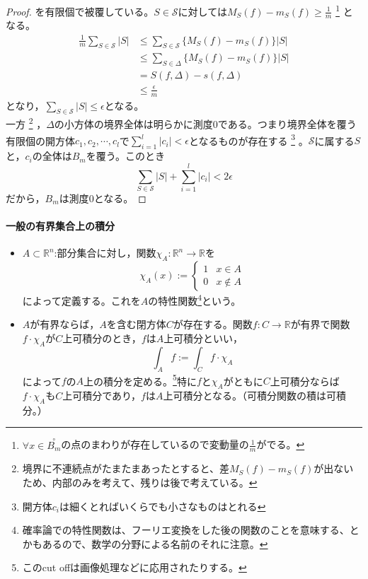 \begin{proof}
{    }
    を有限個で被覆している。$S\in\mathscr{S}$に対しては$\displaystyle M_S(f)-m_S(f)\geq\frac{1}{m}$
    \footnote{
    $\forall x\in\overset{\circ}{B_m}$の点のまわりが存在しているので変動量の$\frac{1}{m}$がでる。
    }
    となる。
	\[
	\begin{split}
		\frac{1}{m}\sum_{S\in\mathscr{S}}|S|
		&\leq\sum_{S\in\mathscr{S}}\{M_S(f)-m_S(f)\}|S| \\
		&\leq\sum_{S\in\Delta}\{M_S(f)-m_S(f)\}|S| \\
		&= S(f,\Delta)-s(f,\Delta) \\
		&\leq\frac{\epsilon}{m}
	\end{split}
	\]
	となり，$\displaystyle\sum_{S\in\mathscr{S}}|S|\leq\epsilon$となる。\\
	一方
    \footnote{
    境界に不連続点がたまたまあったとすると、差$M_S(f)-m_S(f)$が出ないため、内部のみを考えて、残りは後で考えている。
    }
    ，$\Delta$の小方体の境界全体は明らかに測度$0$である。つまり境界全体を覆う有限個の開方体$c_1,c_2,\cdots,c_l$で$\displaystyle \sum_{i=1}^l|c_i|<\epsilon$となるものが存在する
    \footnote{開方体$c_i$は細くとればいくらでも小さなものはとれる
    }
    。$\mathscr{S}$に属する$S$と，$c_i$の全体は$B_m$を覆う。このとき
	\[
	\sum_{S\in\mathscr{S}}|S|+\sum_{i=1}^l|c_i|<2\epsilon
	\]
	だから，$B_m$は測度$0$となる。
\end{proof}

\paragraph{一般の有界集合上の積分}
\begin{itemize}
	\item $A\subset\mathbb{R}^n$:部分集合に対し，関数$\chi_A:\mathbb{R}^n\to\mathbb{R}$を
	\[
		\chi_A(x):=
		\begin{cases}
			1 & x\in A\\
			0 & x\notin A
		\end{cases}
	\]
	によって定義する。これを$A$の特性関数\footnote{確率論での特性関数は、フーリエ変換をした後の関数のことを意味する、とかもあるので、数学の分野による名前のそれに注意。}という。
	\item $A$が有界ならば，$A$を含む閉方体$C$が存在する。関数$f:C\to\mathbb{R}$が有界で関数$f\cdot\chi_A$が$C$上可積分のとき，$f$は$A$上可積分といい，
	\[
		\int_A f := \int_C f\cdot\chi_A
	\]
	によって$f$の$A$上の積分を定める。\footnote{このcut offは画像処理などに応用されたりする。}特に$f$と$\chi_A$がともに$C$上可積分ならば$f\cdot\chi_A$も$C$上可積分であり，$f$は$A$上可積分となる。（可積分関数の積は可積分。）
\end{itemize}

